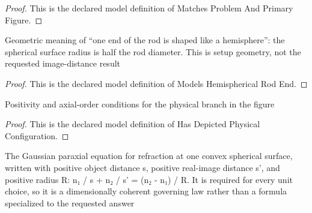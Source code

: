 \begin{proof}
  This is the declared model definition of Matches Problem And Primary Figure.
\end{proof}
\begin{definition}
  \label{def:physics:phyx-mini-0054:phyxminiproblems-problemphyxmini0054-modelshemisphericalrodend}
  Geometric meaning of “one end of the rod is shaped like a hemisphere”: the spherical surface radius is half the rod diameter. This is setup geometry, not the requested image-distance result
\end{definition}
\begin{proof}
  This is the declared model definition of Models Hemispherical Rod End.
\end{proof}
\begin{definition}
  \label{def:physics:phyx-mini-0054:phyxminiproblems-problemphyxmini0054-hasdepictedphysicalconfiguration}
  Positivity and axial-order conditions for the physical branch in the figure
\end{definition}
\begin{proof}
  This is the declared model definition of Has Depicted Physical Configuration.
\end{proof}
\begin{definition}
  \label{def:physics:phyx-mini-0054:phyxminiproblems-problemphyxmini0054-obeysparaxialsphericalsurfaceequation}
  The Gaussian paraxial equation for refraction at one convex spherical surface, written with positive object distance s, positive real-image distance s', and positive radius R: n₁ / s + n₂ / s' = (n₂ - n₁) / R. It is required for every unit choice, so it is a dimensionally coherent governing law rather than a formula specialized to the requested answer
\end{definition}
